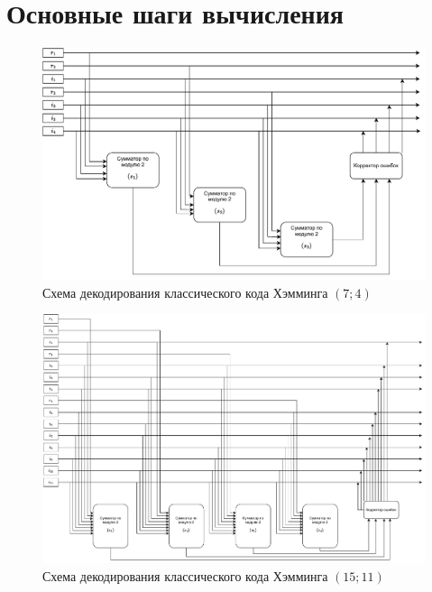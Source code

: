 \section{Основные шаги вычисления}
\begin{figure}[ht]
    \centering
    \includegraphics[scale=0.7]{img/74.pdf}
    \caption{Схема декодирования классического кода Хэмминга $(7; 4)$}
\end{figure}

\begin{figure}
    \centering
    \includegraphics[scale=0.5]{img/1511.pdf}
    \caption{Схема декодирования классического кода Хэмминга $(15; 11)$}
\end{figure}


